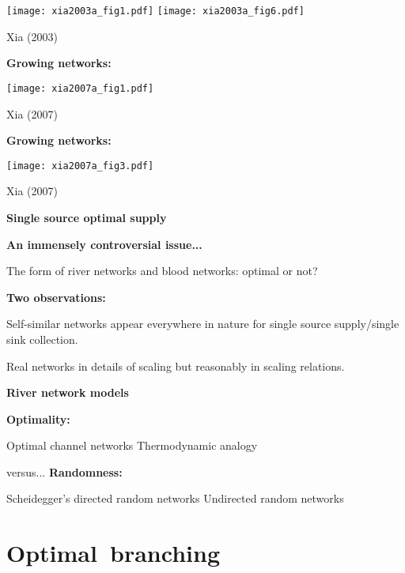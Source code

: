   \texttt{[image: xia2003a\_fig1.pdf]}
  \texttt{[image: xia2003a\_fig6.pdf]}

  Xia (2003)\cite{xia2003a}


  \textbf{Growing networks:}

  \begin{center}
    \texttt{[image: xia2007a\_fig1.pdf]}
  \end{center}


  Xia (2007)\cite{xia2007a}


  \textbf{Growing networks:}

  \begin{center}
    \texttt{[image: xia2007a\_fig3.pdf]}
  \end{center}


  Xia (2007)\cite{xia2007a}


  \textbf{Single source optimal supply}

  \textbf{An immensely controversial issue...}
    
    
      The form of river networks and blood networks:
      optimal or not?\cite{west1997a,banavar1999a,dodds2001a,dodds2010a}
    
  

  \textbf{Two observations:}
    
    
      Self-similar networks appear everywhere in nature
      for single source supply/single sink collection.
    
      Real networks  in \alert{details of scaling}
      but reasonably  in \alert{scaling relations}.
    
  



  \textbf{River network models}

  \textbf{Optimality:}
    
    Optimal channel networks\cite{rodriguez-iturbe1997a}
    Thermodynamic analogy\cite{scheidegger1991a}
    
  
  {versus...}
  \textbf{Randomness:}
    
    Scheidegger's directed random networks
    Undirected random networks
    
  
  

\section{Optimal\ branching}

